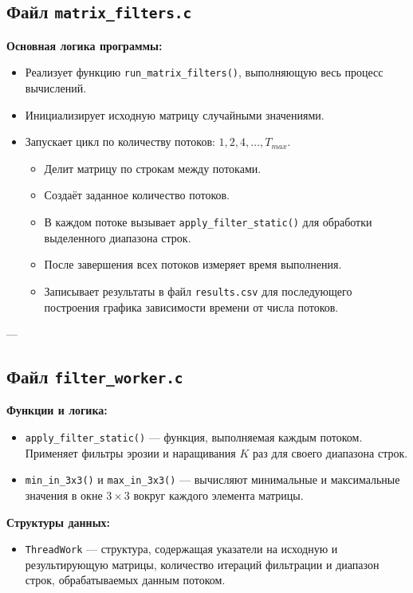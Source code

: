 \subsection*{Файл \texttt{matrix\_filters.c}}
\textbf{Основная логика программы:}
\begin{itemize}
    \item Реализует функцию \texttt{run\_matrix\_filters()}, выполняющую весь процесс вычислений.
    \item Инициализирует исходную матрицу случайными значениями.
    \item Запускает цикл по количеству потоков: $1, 2, 4, \ldots, T_{max}$.
    \begin{itemize}
        \item Делит матрицу по строкам между потоками.
        \item Создаёт заданное количество потоков.
        \item В каждом потоке вызывает \texttt{apply\_filter\_static()} для обработки выделенного диапазона строк.
        \item После завершения всех потоков измеряет время выполнения.
        \item Записывает результаты в файл \texttt{results.csv} для последующего построения графика зависимости времени от числа потоков.
    \end{itemize}
\end{itemize}

---

\subsection*{Файл \texttt{filter\_worker.c}}
\textbf{Функции и логика:}
\begin{itemize}
    \item \texttt{apply\_filter\_static()} — функция, выполняемая каждым потоком. Применяет фильтры эрозии и наращивания $K$ раз для своего диапазона строк.
    \item \texttt{min\_in\_3x3()} и \texttt{max\_in\_3x3()} — вычисляют минимальные и максимальные значения в окне $3 \times 3$ вокруг каждого элемента матрицы.
\end{itemize}

\textbf{Структуры данных:}
\begin{itemize}
    \item \texttt{ThreadWork} — структура, содержащая указатели на исходную и результирующую матрицы, количество итераций фильтрации и диапазон строк, обрабатываемых данным потоком.
\end{itemize}

